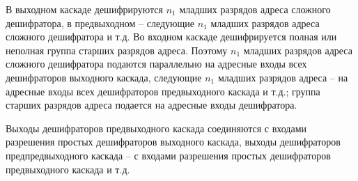 \begin{enumerate}
	В выходном каскаде дешифрируются $n_1$ младших разрядов адреса сложного
	дешифратора, в предвыходном – следующие $n_1$ младших разрядов адреса сложного дешифратора и т.д. Во входном каскаде дешифрируется полная или неполная группа старших разрядов адреса. Поэтому $n_1$ младших разрядов адреса сложного дешифратора подаются параллельно на адресные входы всех дешифраторов выходного каскада, следующие $n_1$ младших разрядов адреса -- на адресные входы всех дешифраторов предвыходного каскада и т.д.; группа старших разрядов адреса подается на адресные входы дешифратора.
	
	Выходы дешифраторов предвыходного каскада соединяются с входами разрешения
	простых дешифраторов выходного каскада, выходы дешифраторов
	предпредвыходного каскада -- с входами разрешения простых дешифраторов
	предвыходного каскада и т.д.
	
\end{enumerate}
